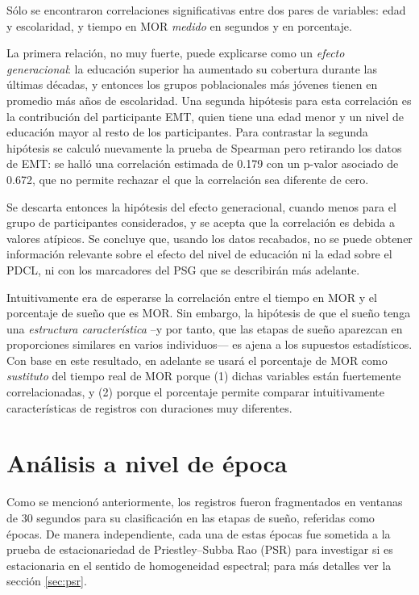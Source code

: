 \documentclass[12pt,letterpaper]{book}
\begin{document}
Sólo se encontraron correlaciones significativas entre dos pares de variables: edad y escolaridad, y tiempo en MOR \textit{medido} en segundos y en porcentaje.

La primera relación, no muy fuerte, puede explicarse como un \textit{efecto generacional}: la educación superior ha aumentado su cobertura durante las últimas décadas, y entonces los grupos poblacionales más jóvenes tienen en promedio más años de escolaridad. 
%
Una segunda hipótesis para esta correlación es la contribución del participante EMT, quien tiene una edad menor y un nivel de educación mayor al resto de los participantes.
%
Para contrastar la segunda hipótesis se calculó nuevamente la prueba de Spearman pero retirando los datos de EMT: se halló una correlación estimada de 0.179 con un p-valor asociado de 0.672, que no permite rechazar el que la correlación sea diferente de cero.

Se descarta entonces la hipótesis del efecto generacional, cuando menos para el grupo de participantes considerados, y se acepta que la correlación es debida a valores atípicos. Se concluye que, usando los datos recabados, no se puede obtener información relevante sobre el efecto del nivel de educación ni la edad sobre el PDCL, ni con los marcadores del PSG que se describirán más adelante.

Intuitivamente era de esperarse la correlación entre el tiempo en MOR y el porcentaje de sueño que es MOR.
%
Sin embargo, la hipótesis de que el sueño tenga una \textit{estructura característica} --y por tanto, que las etapas de sueño aparezcan en proporciones similares en varios individuos--- es ajena a los supuestos estadísticos.
%
Con base en este resultado, en adelante se usará el porcentaje de MOR como \textit{sustituto} del tiempo real de MOR porque (1) dichas variables están fuertemente correlacionadas, y (2) porque el porcentaje permite comparar intuitivamente características de registros con duraciones muy diferentes.


\section{Análisis a nivel de época}
\label{sec:analisis_epoca}

Como se mencionó anteriormente, los registros fueron fragmentados en ventanas de 30 segundos para su clasificación en las etapas de sueño, referidas como épocas.
%
De manera independiente, cada una de estas épocas fue sometida a la prueba de estacionariedad de Priestley--Subba Rao (PSR) para investigar si es estacionaria en el sentido de homogeneidad espectral; para más detalles ver la sección \ref{sec:psr}.
\end{document}
